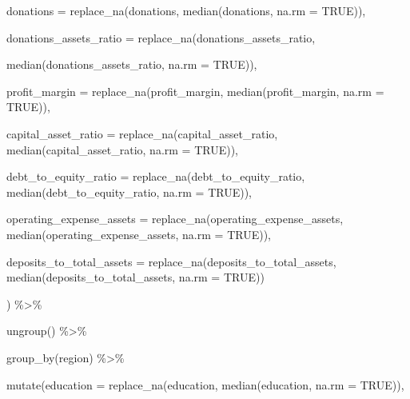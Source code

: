 \documentclass[a4paper,nobind]{templates/ociamthesis}
\newenvironment{Shaded}{\begin{snugshade}}{\end{snugshade}}
\newcommand{\AttributeTok}[1]{\textcolor[rgb]{0.77,0.63,0.00}{#1}}
\newcommand{\ConstantTok}[1]{\textcolor[rgb]{0.00,0.00,0.00}{#1}}
\newcommand{\FunctionTok}[1]{\textcolor[rgb]{0.00,0.00,0.00}{#1}}
\newcommand{\NormalTok}[1]{#1}
\newcommand{\SpecialCharTok}[1]{\textcolor[rgb]{0.00,0.00,0.00}{#1}}
\renewenvironment{Shaded}
{
  \vspace{10pt}%
  \begin{snugshade}%
}{%
  \end{snugshade}%
  \vspace{8pt}%
}
\begin{document}
\begin{Shaded}
\begin{Highlighting}[]
         \AttributeTok{donations =} \FunctionTok{replace\_na}\NormalTok{(donations, }\FunctionTok{median}\NormalTok{(donations, }\AttributeTok{na.rm =} \ConstantTok{TRUE}\NormalTok{)),}
         
         \AttributeTok{donations\_assets\_ratio =} \FunctionTok{replace\_na}\NormalTok{(donations\_assets\_ratio, }
                                             
                                  \FunctionTok{median}\NormalTok{(donations\_assets\_ratio, }\AttributeTok{na.rm =} \ConstantTok{TRUE}\NormalTok{)), }
         
         \AttributeTok{profit\_margin =} \FunctionTok{replace\_na}\NormalTok{(profit\_margin, }\FunctionTok{median}\NormalTok{(profit\_margin, }\AttributeTok{na.rm =} \ConstantTok{TRUE}\NormalTok{)),}
         
         \AttributeTok{capital\_asset\_ratio =} \FunctionTok{replace\_na}\NormalTok{(capital\_asset\_ratio, }\FunctionTok{median}\NormalTok{(capital\_asset\_ratio, }\AttributeTok{na.rm =} \ConstantTok{TRUE}\NormalTok{)),}
         
         \AttributeTok{debt\_to\_equity\_ratio =} \FunctionTok{replace\_na}\NormalTok{(debt\_to\_equity\_ratio, }\FunctionTok{median}\NormalTok{(debt\_to\_equity\_ratio, }\AttributeTok{na.rm =} \ConstantTok{TRUE}\NormalTok{)),}
         
         \AttributeTok{operating\_expense\_assets =} \FunctionTok{replace\_na}\NormalTok{(operating\_expense\_assets, }\FunctionTok{median}\NormalTok{(operating\_expense\_assets, }\AttributeTok{na.rm =} \ConstantTok{TRUE}\NormalTok{)),}
         
         \AttributeTok{deposits\_to\_total\_assets =} \FunctionTok{replace\_na}\NormalTok{(deposits\_to\_total\_assets, }\FunctionTok{median}\NormalTok{(deposits\_to\_total\_assets, }\AttributeTok{na.rm =} \ConstantTok{TRUE}\NormalTok{))}
         
         
\NormalTok{         ) }\SpecialCharTok{\%\textgreater{}\%} 
  
  \FunctionTok{ungroup}\NormalTok{() }\SpecialCharTok{\%\textgreater{}\%} 
  
  \FunctionTok{group\_by}\NormalTok{(region) }\SpecialCharTok{\%\textgreater{}\%} 
  
  \FunctionTok{mutate}\NormalTok{(}\AttributeTok{education =} \FunctionTok{replace\_na}\NormalTok{(education, }\FunctionTok{median}\NormalTok{(education, }\AttributeTok{na.rm =} \ConstantTok{TRUE}\NormalTok{)),}
         

\end{Highlighting}
\end{Shaded}
\end{document}
